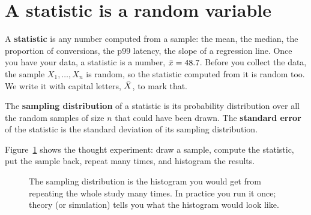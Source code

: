 \section{A statistic is a random variable}
\label{sec:sd-statistic}

A \textbf{statistic} is any number computed from a sample: the mean, the median,
the proportion of conversions, the p99 latency, the slope of a regression line.
Once you have your data, a statistic is a number, $\bar{x}=48.7$. Before you
collect the data, the sample $X_1,\dots,X_n$ is random, so the statistic
computed from it is random too. We write it with capital letters, $\bar{X}$, to mark
that.

\begin{definition}
The \textbf{sampling distribution} of a statistic is its probability distribution
over all the random samples of size $n$ that could have been drawn. The
\textbf{standard error} of the statistic is the standard deviation of its sampling
distribution.
\end{definition}

Figure~\ref{fig:sd-flow} shows the thought experiment: draw a sample, compute
the statistic, put the sample back, repeat many times, and histogram the results.

\begin{figure}[H]
\centering
{}
\caption{The sampling distribution is the histogram you would get from repeating
the whole study many times. In practice you run it once; theory (or
simulation) tells you what the histogram would look like.}
\label{fig:sd-flow}
\end{figure}

